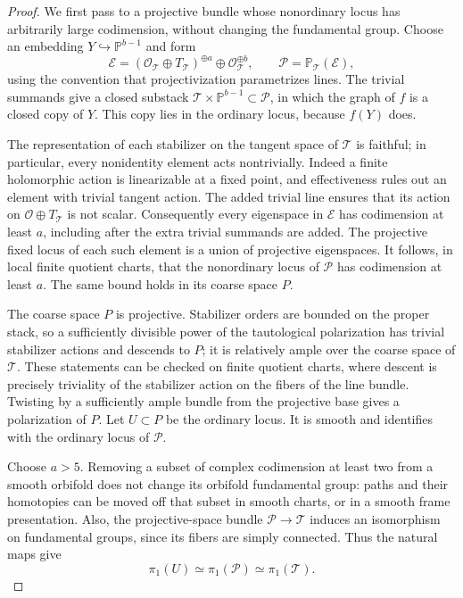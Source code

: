 \documentclass[11pt,reqno]{amsart}
\numberwithin{equation}{section}
\theoremstyle{definition}
\theoremstyle{remark}
\newcommand{\PP}{\mathbb P}
\begin{document}
\begin{proof}
We first pass to a projective bundle whose nonordinary locus has
arbitrarily large codimension, without changing the fundamental group.
Choose an embedding $Y\hookrightarrow\PP^{b-1}$ and form
\[
 \mathcal E=(\mathcal O_{\mathcal T}\oplus T_{\mathcal T})^{\oplus a}
                 \oplus\mathcal O_{\mathcal T}^{\oplus b},
 \qquad \mathcal P=\PP_{\mathcal T}(\mathcal E),
\]
using the convention that projectivization parametrizes lines.  The
trivial summands give a closed substack
$\mathcal T\times\PP^{b-1}\subset\mathcal P$, in which the graph of
$f$ is a closed copy of $Y$.  This copy lies in the ordinary locus,
because $f(Y)$ does.

The representation of each stabilizer on the tangent space of
$\mathcal T$ is faithful; in particular, every nonidentity element acts
nontrivially.  Indeed a finite holomorphic action is linearizable at a
fixed point, and effectiveness rules out an element with trivial tangent
action.  The added trivial line ensures
that its action on $\mathcal O\oplus T_{\mathcal T}$ is not scalar.
Consequently every eigenspace in $\mathcal E$ has codimension at least
$a$, including after the extra trivial summands are added.  The
projective fixed locus of each such element is a union of projective
eigenspaces.  It follows, in local finite quotient charts, that the
nonordinary locus of $\mathcal P$ has codimension at least $a$.
The same bound holds in its coarse space $P$.

The coarse space $P$ is projective.  Stabilizer orders are bounded on
the proper stack, so a sufficiently divisible power of the tautological
polarization has trivial stabilizer actions and
descends to $P$; it is relatively ample over the coarse space of
$\mathcal T$.  These statements can be checked on finite quotient
charts, where descent is precisely triviality of the stabilizer action
on the fibers of the line bundle.  Twisting by a sufficiently ample
bundle from the projective base gives a polarization of $P$.
Let $U\subset P$ be the ordinary locus.  It is smooth and identifies
with the ordinary locus of $\mathcal P$.

Choose $a>5$.  Removing a subset of complex codimension at least two
from a smooth orbifold does not change its orbifold fundamental group:
paths and their homotopies can be moved off that subset in smooth
charts, or in a smooth frame presentation.  Also, the projective-space
bundle $\mathcal P\to\mathcal T$ induces an isomorphism on fundamental
groups, since its fibers are simply connected.  Thus the natural maps
give
\begin{equation}\label{proj:ordinary-group}
 \pi_1(U)\simeq\pi_1(\mathcal P)\simeq\pi_1(\mathcal T).
\end{equation}


\end{proof}
\end{document}
